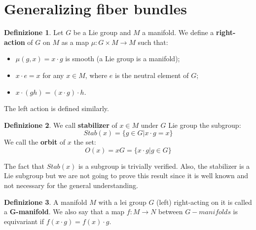 \documentclass[12pt,a4paper]{report}
\theoremstyle{definition}
\newtheorem{Def}{Definizione}[chapter]
\theoremstyle{Theorem}
\theoremstyle{definition}
\theoremstyle{definition}
\theoremstyle{definition}
\begin{document}
	\section{Generalizing fiber bundles}
	\begin{Def}
		Let $G$ be a Lie group and $M$ a manifold. We define a \textbf{right-action} of $G$ on $M$ as a map $\mu:G\times M\rightarrow M$ such that:
		\begin{itemize}
			\item $\mu(g,x)=x\cdot g$ is smooth (a Lie group is a manifold);
			\item $x\cdot e=x$ for any $x\in M$, where $e$ is the neutral element of $G$;
			\item $x\cdot (gh)=(x\cdot g)\cdot h$.
		\end{itemize}
		The left action is defined similarly.
	\end{Def}
	\begin{Def}
		We call \textbf{stabilizer} of $x\in M$ under $G$ Lie group the subgroup:
		$$Stab(x)=\{g\in G|x\cdot g=x\}$$
		We call the \textbf{orbit} of $x$ the set:
		$$O(x)=xG=\{x\cdot g|g\in G\}$$
	\end{Def}
	The fact that $Stab(x)$ is a subgroup is trivially verified. Also, the stabilizer is a Lie subgroup but we are not going to prove this result since it is well known and not necessary for the general understanding.
	\begin{Def}
		A manifold $M$ with a lei group $G$ (left) right-acting on it is called a \textbf{G-manifold}. We also say that a map $f:M\rightarrow N$ between $G-manifolds$ is equivariant if $f(x\cdot g)=f(x)\cdot g$.
	\end{Def}
\end{document}

